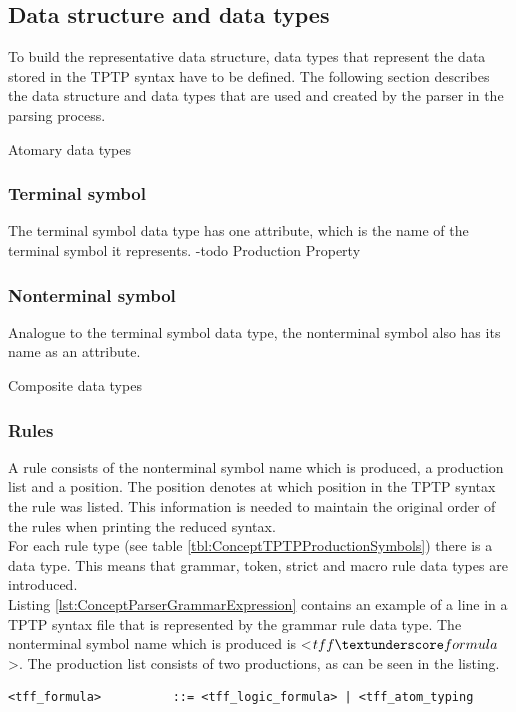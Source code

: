 \subsection{Data structure and data types}\label{sec:ConceptParserDataStructure}
To build the representative data structure, data types that represent the data stored in the \ac{TPTP} syntax have to be defined.
The following section describes the data structure and data types that are used and created by the parser in the parsing process.

Atomary data types

\subsubsection{Terminal symbol}
The terminal symbol data type has one attribute, which is the name of the terminal symbol it represents.
-todo Production Property

\subsubsection{Nonterminal symbol}
Analogue to the terminal symbol data type, the nonterminal symbol also has its name as an attribute.

Composite data types

\subsubsection{Rules}
A rule consists of the nonterminal symbol name which is produced, a production list and a position.
The position denotes at which position in the \ac{TPTP} syntax the rule was listed.
This information is needed to maintain the original order of the rules when printing the reduced syntax.\\
For each rule type (see table \ref{tbl:ConceptTPTPProductionSymbols}) there is a data type. This means that grammar, token, strict and macro rule data types are introduced.\\
Listing \ref{lst:ConceptParserGrammarExpression} contains an example of a line in a \ac{TPTP} syntax file that is represented by the grammar rule data type.
The nonterminal symbol name which is produced is <$tff \textunderscore formula$>.  The production list consists of two productions, as can be seen in the listing.
\begin{lstlisting}[basicstyle=\scriptsize	,caption= Example of a grammar expression,label= lst:ConceptParserGrammarExpression]
<tff_formula>          ::= <tff_logic_formula> | <tff_atom_typing
\end{lstlisting}
